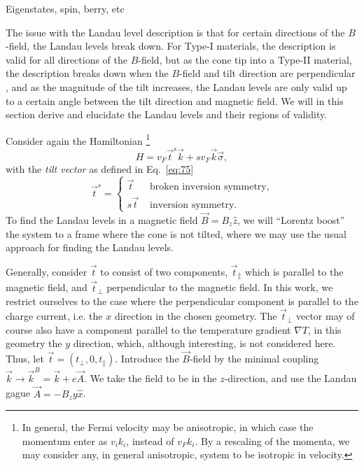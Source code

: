 Eigenstates, spin, berry, etc

The issue with the Landau level description is that for certain directions of the \(B\)-field, the Landau levels break down.
For Type-I materials, the description is valid for all directions of the \(B\)-field, but as the cone tip into a Type-II material, the description breaks down when the \(B\)-field and tilt direction are perpendicular \cite{sharmaChiralAnomalyLongitudinal2017}, and as the magnitude of the tilt increases, the Landau levels are only valid up to a certain angle between the tilt direction and magnetic field.
We will in this section derive and elucidate the Landau levels and their regions of validity.

Consider again the Hamiltonian
\footnote{In general, the Fermi velocity may be anisotropic, in which case the momentum enter as \( v_i k_i \), instead of \( v_F k_i \). By a rescaling of the momenta, we may consider any, in general anisotropic, system to be isotropic in velocity.}
\begin{equation}
  \label{eq:16}
  H = v_{F} \vec{t}^s  \vec{k} + s v_{F} \vec{k} \vec{\sigma},
\end{equation}
with the \emph{tilt vector} as defined in Eq.~\eqref{eq:75}
\[
  \vec{t}^s
  =
  \begin{cases}
    \vec{t} & \text{ broken inversion symmetry},\\
    s \vec{t} & \text{ inversion symmetry}.
  \end{cases}
\]
To find the Landau levels in a magnetic field \(\vec{B} = B_{z}\hat{z} \), we will ``Lorentz boost'' the system to a frame where the cone is not tilted, where we may use the usual approach for finding the Landau levels.

Generally, consider \( \vec{t} \) to consist of two components, \( \vec{t}_{\parallel} \) which is parallel to the magnetic field, and \( \vec{t}_{\perp} \) perpendicular to the magnetic field.
In this work, we restrict ourselves to the case where the perpendicular component is parallel to the charge current, i.e. the \( x \) direction in the chosen geometry.
The \( \vec{t}_{\perp} \) vector may of course also have a component parallel to the temperature gradient \( \nabla T \), in this geometry the \( y \) direction, which, although interesting, is not considered here.
Thus, let \( \vec{t} = (t_{\perp}, 0, t_{\parallel}) \).
Introduce the \(\vec{B}\)-field by the minimal coupling \(\vec{k} \to \vec{k}^B = \vec{k} + e \vec{A}\).
We take the field to be in the \( z \)-direction, and use the Landau gague \(\vec{A} = -B_{z}y \hat{x}\).

